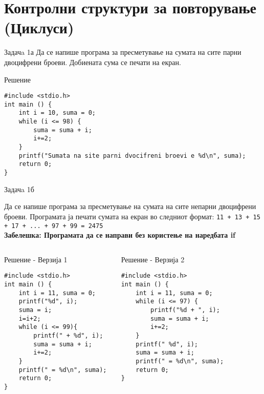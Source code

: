 \section{Контролни структури за повторување (Циклуси)}

\begin{frame}[fragile]{Задачa 1а}
Да се напише програма за пресметување на сумата на сите парни двоцифрени броеви. Добиената сума се печати на екран.
\pause
\begin{exampleblock}{Решение}
    \begin{lstlisting}
#include <stdio.h> 
int main () { 
    int i = 10, suma = 0; 
    while (i <= 98) { 
        suma = suma + i; 
        i+=2; 
    } 
    printf("Sumata na site parni dvocifreni broevi e %d\n", suma); 
    return 0; 
}
\end{lstlisting}
\end{exampleblock}
\end{frame}


\begin{frame}[fragile]{Задачa 1б}
\begin{scriptsize}
Да се напише програма за пресметување на сумата на сите непарни двоцифрени броеви. Програмата ја печати сумата на екран во следниот формат: \texttt{11 + 13 + 15 + 17 + ... + 97 + 99 = 2475}\\
\textbf{Забелешка: Програмата да се направи без користење на наредбата if}
\end{scriptsize}
\pause
\begin{columns}
\begin{exampleblock}{Решение - Верзија 1}
\begin{lstlisting}
#include <stdio.h>
int main () { 
    int i = 11, suma = 0; 
    printf("%d", i); 
    suma = i; 
    i=i+2; 
    while (i <= 99){ 
        printf(" + %d", i); 
        suma = suma + i; 
        i+=2; 
    } 
    printf(" = %d\n", suma); 
    return 0; 
}
\end{lstlisting}
\end{exampleblock}
\pause
{}
\begin{exampleblock}{Решение - Верзија 2}
\begin{lstlisting}
#include <stdio.h> 
int main () { 
    int i = 11, suma = 0; 
    while (i <= 97) { 
        printf("%d + ", i); 
        suma = suma + i; 
        i+=2; 
    } 
    printf(" %d", i); 
    suma = suma + i; 
    printf(" = %d\n", suma); 
    return 0; 
} 
\end{lstlisting}
\end{exampleblock}
\end{columns}
\end{frame}

